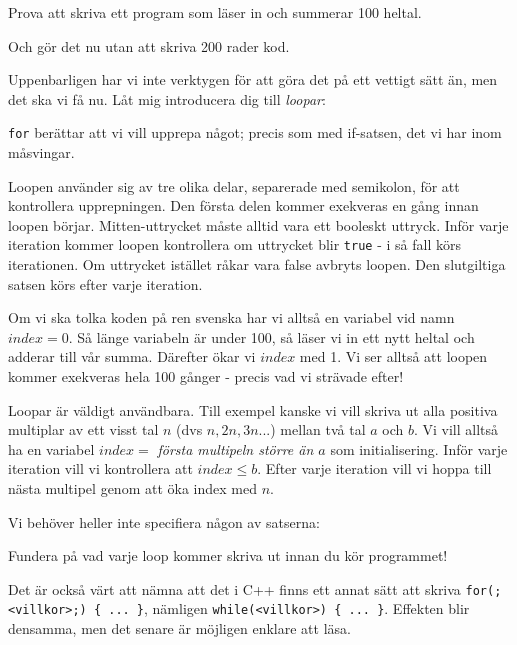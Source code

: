 Prova att skriva ett program som läser in och summerar 100 heltal.

Och gör det nu utan att skriva 200 rader kod.

Uppenbarligen har vi inte verktygen för att göra det på ett vettigt sätt än, men det ska vi få nu. Låt mig introducera dig till \emph{loopar}:



\texttt{for} berättar att vi vill upprepa något; precis som med if-satsen, det vi har inom måsvingar. 

Loopen använder sig av tre olika delar, separerade med semikolon, för att kontrollera upprepningen. Den första delen kommer exekveras en gång innan loopen börjar. Mitten-uttrycket måste alltid vara ett booleskt uttryck. Inför varje iteration kommer loopen kontrollera om uttrycket blir \texttt{true} - i så fall körs iterationen. Om uttrycket istället råkar vara false avbryts loopen. Den slutgiltiga satsen körs efter varje iteration.

Om vi ska tolka koden på ren svenska har vi alltså en variabel vid namn $index = 0$. Så länge variabeln är under 100, så läser vi in ett nytt heltal och adderar till vår summa. Därefter ökar vi $index$ med 1. Vi ser alltså att loopen kommer exekveras hela 100 gånger - precis vad vi strävade efter!

Loopar är väldigt användbara. Till exempel kanske vi vill skriva ut alla positiva multiplar av ett visst tal $n$ (dvs $n, 2n, 3n...$) mellan två tal $a$ och $b$. Vi vill alltså ha en variabel $index = $ \emph{första multipeln större än $a$} som initialisering. Inför varje iteration vill vi kontrollera att $index \le b$. Efter varje iteration vill vi hoppa till nästa multipel genom att öka index med $n$.



Vi behöver heller inte specifiera någon av satserna:



Fundera på vad varje loop kommer skriva ut innan du kör programmet!

Det är också värt att nämna att det i C++ finns ett annat sätt att skriva \texttt{for(;<villkor>;) \{ ... \}}, nämligen \texttt{while(<villkor>) \{ ... \}}. Effekten blir densamma, men det senare är möjligen enklare att läsa.
